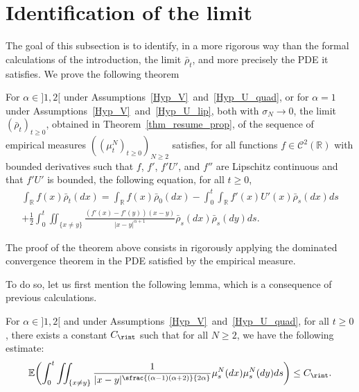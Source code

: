 \section{Identification of the limit}\label{appendice_id_limit}

The goal of this subsection is to identify, in a more rigorous way than the formal calculations of the introduction, the limit $\bar{\rho}_t$, and more precisely the PDE it satisfies. We prove the following theorem

\begin{theorem}\label{id_limit}
For $\alpha\in{}]1,2[$ under Assumptions~\ref{Hyp_V}~and~\ref{Hyp_U_quad}, or for $\alpha=1$ under Assumptions~\ref{Hyp_V}~and~\ref{Hyp_U_lip}, both with $\sigma_N\to0$, the limit $(\bar{\rho}_t)_{t\geq0}$, obtained in Theorem~\ref{thm_resume_prop}, of the sequence of empirical measures $((\mu_t^N)_{t\geq0})_{N\geq2}$ satisfies, for all functions $f\in\mathcal{C}^2(\mathbb{R})$ with bounded derivatives such that $f$, $f'$, $f'U'$, and $f''$ are Lipschitz continuous and that $f'U'$ is bounded, the following equation, for all $t\geqslant 0$,
\begin{multline*}
\int_{\mathbb{R}}f(x)\bar{\rho}_t(dx)=\int_{\mathbb{R}}f(x)\bar{\rho}_0(dx)-\int_{0}^t\int_{\mathbb{R}}f'(x)U'(x)\bar{\rho}_s(dx)ds\\
+\frac{1}{2}\int_{0}^t\iint_{\{x\neq y\}}\frac{(f'(x)-f'(y))(x-y)}{|x-y|^{\alpha+1}}\bar{\rho}_s(dx)\bar{\rho}_s(dy)ds.
\end{multline*}
\end{theorem}

The proof of the theorem above consists in rigorously applying the dominated convergence theorem in the PDE satisfied by the empirical measure.

To do so, let us first mention the following lemma, which is a consequence of previous calculations.

\begin{lemma}
For $\alpha\in{}]1,2[$ and under Assumptions~\ref{Hyp_V}~and~\ref{Hyp_U_quad}, for all $t\geqslant 0$, there exists a constant $C_{\rint}$ such that for all $N\geq2$, we have the following estimate:
\begin{equation}\label{estime_int_id_lim}
\mathbb{E}\biggl(\int_{0}^t\iint_{\{x\neq y\}}\frac{1}{|x-y|^{\sfrac{(\alpha-1)(\alpha+2)}{2\alpha}}}\mu^N_s(dx)\mu^N_s(dy)ds\biggr)\leq C_{\rint}.
\end{equation}
\end{lemma}

